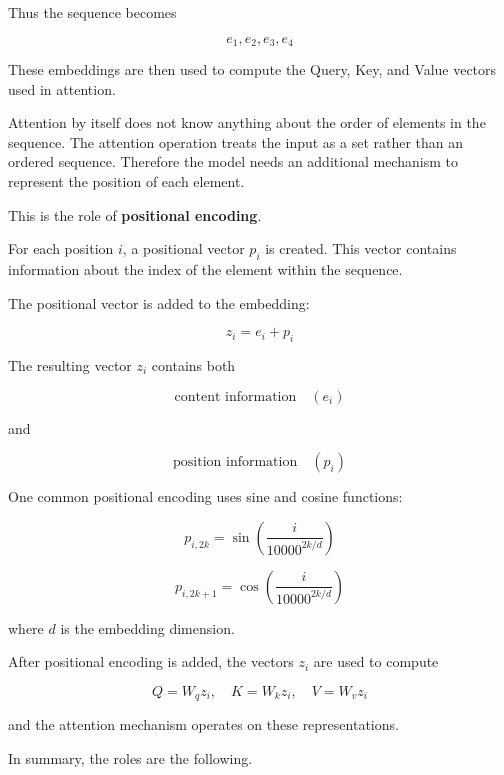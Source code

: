 \documentclass{book}
\providecommand{\ProjectDeepHeading}[2]{%
    \par\medskip\noindent\textbf{#2}\par\smallskip
}
\begin{document}
    Thus the sequence becomes
    
    \[
    e_1, e_2, e_3, e_4
    \]
    
    These embeddings are then used to compute the Query, Key, and Value vectors used in attention.
    
    
    
    \ProjectDeepHeading{7}{}


Attention by itself does not know anything about the order of elements in the sequence. The attention operation treats the input as a set rather than an ordered sequence. Therefore the model needs an additional mechanism to represent the position of each element.
    
    This is the role of \textbf{positional encoding}.
    
    For each position \(i\), a positional vector \(p_i\) is created. This vector contains information about the index of the element within the sequence.
    
    The positional vector is added to the embedding:
    
    \[
    z_i = e_i + p_i
    \]
    
    The resulting vector \(z_i\) contains both
    
    \[
    \text{content information} \quad (e_i)
    \]
    
    and
    
    \[
    \text{position information} \quad (p_i)
    \]
    
    One common positional encoding uses sine and cosine functions:
    
    \[
    p_{i,2k} = \sin\!\left(\frac{i}{10000^{2k/d}}\right)
    \]
    
    \[
    p_{i,2k+1} = \cos\!\left(\frac{i}{10000^{2k/d}}\right)
    \]
    
    where \(d\) is the embedding dimension.
    
    After positional encoding is added, the vectors \(z_i\) are used to compute
    
    \[
    Q = W_q z_i, \quad K = W_k z_i, \quad V = W_v z_i
    \]
    
    and the attention mechanism operates on these representations.
    
    In summary, the roles are the following.
    
\end{document}
